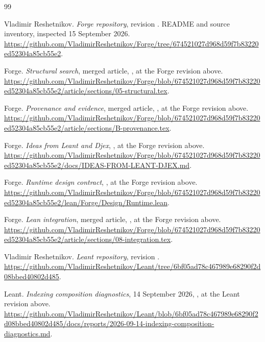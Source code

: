 \begin{thebibliography}{99}
\small\raggedright
{} Vladimir Reshetnikov.
\emph{Forge repository}, revision
.
README and source inventory, inspected 15 September 2026.
\url{https://github.com/VladimirReshetnikov/Forge/tree/674521027d968d59f7b83220ed52304a85cb55e2}.

 Forge.
\emph{Structural search}, merged article,
, at the Forge revision above.
\url{https://github.com/VladimirReshetnikov/Forge/blob/674521027d968d59f7b83220ed52304a85cb55e2/article/sections/05-structural.tex}.

 Forge.
\emph{Provenance and evidence}, merged article,
, at the Forge revision above.
\url{https://github.com/VladimirReshetnikov/Forge/blob/674521027d968d59f7b83220ed52304a85cb55e2/article/sections/B-provenance.tex}.

 Forge.
\emph{Ideas from Leant and Djex},
, at the Forge revision above.
\url{https://github.com/VladimirReshetnikov/Forge/blob/674521027d968d59f7b83220ed52304a85cb55e2/docs/IDEAS-FROM-LEANT-DJEX.md}.

 Forge.
\emph{Runtime design contract},
, at the Forge revision above.
\url{https://github.com/VladimirReshetnikov/Forge/blob/674521027d968d59f7b83220ed52304a85cb55e2/lean/Forge/Design/Runtime.lean}.

 Forge.
\emph{Lean integration}, merged article,
, at the Forge revision above.
\url{https://github.com/VladimirReshetnikov/Forge/blob/674521027d968d59f7b83220ed52304a85cb55e2/article/sections/08-integration.tex}.

 Vladimir Reshetnikov.
\emph{Leant repository}, revision
.
\url{https://github.com/VladimirReshetnikov/Leant/tree/6bf05ad78c467989e68290f2d08bbed40802d485}.

 Leant.
\emph{Indexing composition diagnostics}, 14 September 2026,
,
at the Leant revision above.
\url{https://github.com/VladimirReshetnikov/Leant/blob/6bf05ad78c467989e68290f2d08bbed40802d485/docs/reports/2026-09-14-indexing-composition-diagnostics.md}.


\end{thebibliography}
